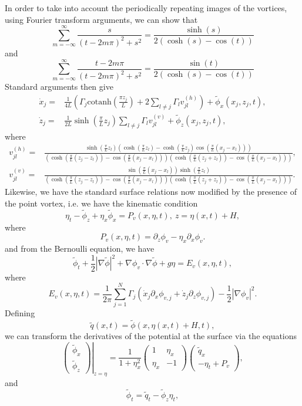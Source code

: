 \documentclass[a4paper,11pt]{article}
\newcommand{\bp}{\begin{pmatrix}}
\newcommand{\ep}{\end{pmatrix}}
\newcommand{\p}{\partial}
\begin{document}
In order to take into account the periodically repeating images of the vortices, using Fourier transform arguments, we can show that 
\[
\sum_{m=-\infty}^{\infty}\frac{s}{(t-2m\pi)^{2}+s^{2}} = \frac{\sinh(s)}{2(\cosh(s)-\cos(t))}
\]
and
\[
\sum_{m=-\infty}^{\infty}\frac{t-2m\pi}{(t-2m\pi)^{2}+s^{2}} = \frac{\sin(t)}{2(\cosh(s)-\cos(t))}
\]
Standard arguments then give 
\begin{align*}
\dot{x}_{j} = & \frac{1}{4L}\left(  \Gamma_{j}\mbox{cotanh}\left(\frac{\pi z_{j}}{L} \right)+2\sum_{l\neq j}\Gamma_{l}v_{jl}^{(h)} \right)+ \tilde{\phi}_{x}(x_{j},z_{j},t),\\
\dot{z}_{j} = & \frac{1}{2L}\sinh\left(\frac{\pi}{L}z_{j}\right)\sum_{l\neq j} \Gamma_{l} v_{jl}^{(v)} + \tilde{\phi}_{z}(x_{j},z_{j},t),
\end{align*}
where
\begin{align*}
v_{jl}^{(h)} = & \frac{\sinh\left(\frac{\pi}{L}z_{l}\right)\left(\cosh(\frac{\pi}{L}z_{l})-\cosh(\frac{\pi}{L}z_{j})\cos\left(\frac{\pi}{L}(x_{j}-x_{l})\right)\right)}{\left(\cosh\left(\frac{\pi}{L}(z_{j}-z_{l})\right)-\cos\left(\frac{\pi}{L}(x_{j}-x_{l})\right)\right)\left(\cosh\left(\frac{\pi}{L}(z_{j}+z_{l})\right)-\cos\left(\frac{\pi }{L}(x_{j}-x_{l})\right)\right)}, \\
v_{jl}^{(v)} = & \frac{\sin\left(\frac{\pi}{L}(x_{j}-x_{l})\right)\sinh\left(\frac{\pi}{L}z_{l}\right)}{\left(\cosh\left(\frac{\pi}{L}(z_{j}-z_{l})\right)-\cos\left(\frac{\pi}{L}(x_{j}-x_{l})\right)\right)\left(\cosh\left(\frac{\pi}{L}(z_{j}+z_{l})\right)-\cos\left(\frac{\pi }{L}(x_{j}-x_{l})\right)\right)}.
\end{align*}
Likewise, we have the standard surface relations now modified by the presence of the point vortex, i.e. we have the kinematic condition 
\[
\eta_{t} - \tilde{\phi}_{z} + \eta_{x}\tilde{\phi}_{x} =  P_{v}(x,\eta,t), ~ z =  \eta(x,t)+H,  
\]
where
\[
P_{v}(x,\eta,t) =   \p_{z}\phi_{v} -  \eta_{x}\p_{x}\phi_{v} .
\]
and from the Bernoulli equation, we have 
\[
\tilde{\phi}_{t} + \frac{1}{2 }\left| \nabla \tilde{\phi} \right|^{2} +  \nabla\phi_{v}\cdot \nabla\tilde{\phi} + g\eta = E_{v}(x,\eta,t),
\]
where
\[
E_{v}(x,\eta,t) = \frac{1}{2\pi}\sum_{j=1}^{N}\Gamma_{j}\left(\dot{x}_{j}\p_{x}\phi_{v,j} + \dot{z}_{j} \p_{z}\phi_{v,j}  \right) - \frac{1}{2}\left| \nabla \phi_{v} \right|^{2}.
\]
Defining 
\[
\tilde{q}(x,t) = \tilde{\phi}(x,\eta(x,t)+H,t),
\]
we can transform the derivatives of the potential at the surface via the equations
\[
\left.\bp\tilde{\phi}_{x}\\ \tilde{\phi}_{z}\ep\right|_{z=\eta} = \frac{1}{1+\eta_{x}^{2}}\bp 1 & \eta_{x}\\ \eta_{x} & -1\ep\bp\tilde{q}_{x} \\  -\eta_{t} + P_{v}\ep,
\]
and
\[
\tilde{\phi}_{t} = \tilde{q}_{t}-\tilde{\phi}_{z}\eta_{t},
\]
\end{document}
